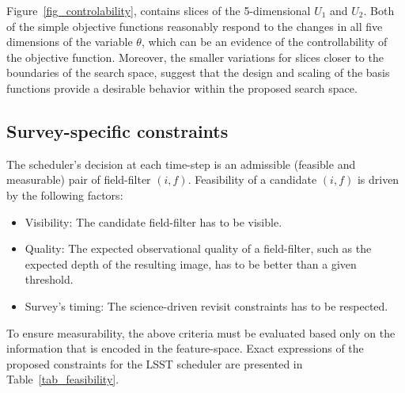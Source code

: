 \documentclass[12pt]{aastex62}
\theoremstyle{definition}
\begin{document}
Figure~\ref{fig_controlability}, contains slices of the 5-dimensional $U_1$ and $U_2$. Both of the simple objective functions reasonably respond to the changes in all five dimensions of the variable $\theta$, which can be an evidence of the controllability of the objective function. Moreover, the smaller variations for slices closer to the boundaries of the search space, suggest that the design and scaling of the basis functions provide a desirable behavior within the proposed search space.

\subsection{Survey-specific constraints}\label{sec_cstr}

The scheduler's decision at each time-step is an admissible (feasible and measurable) pair of field-filter $(i,f)$. Feasibility of a candidate $(i,f)$ is driven by the following factors:

\begin{itemize}
\item Visibility: The candidate field-filter has to be visible.
\item Quality: The expected observational quality of a field-filter, such as the expected depth of the resulting image, has to be better than a given threshold.
\item Survey's timing: The science-driven revisit constraints has to be respected.
\end{itemize}

To ensure measurability, the above criteria must be evaluated based only on the information that is encoded in the feature-space. Exact expressions of the proposed constraints for the LSST scheduler are presented in Table~\ref{tab_feasibility}.
\end{document}

